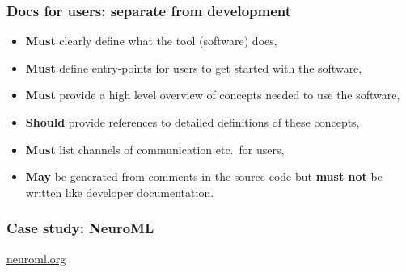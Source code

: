 \begin{frame}[c]
  \frametitle{Docs for users: separate from development}
  \begin{itemize}
    \item \textbf{Must} clearly define what the tool (software) does,
    \item \textbf{Must} define \alert{entry-points} for users to get started with the software,
    \item \textbf{Must} provide a \alert{high level} overview of concepts needed to use the software,
    \item \textbf{Should} provide references to detailed definitions of these concepts,
    \item \textbf{Must} list channels of communication etc.\ for users,
      \pause{}
    \item \textbf{May} be generated from comments in the source code but \textbf{must not} be written like developer documentation.
  \end{itemize}
\end{frame}
\begin{frame}[c]
  \frametitle{Case study: NeuroML}
  \href{https://neuroml.org}{neuroml.org}
\end{frame}
